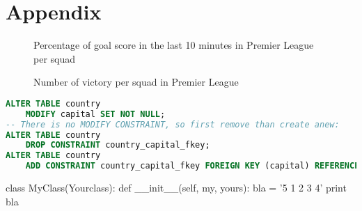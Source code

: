 \documentclass[a4paper,15pt]{article}
\begin{document}
\section{Appendix}

\begin{figure}[!htbp]
    \centering
        \caption{Percentage of goal score in the last 10 minutes in Premier League per squad}
\end{figure}

\mydata
    
\begin{figure}[!htbp]
    \centering
        \caption{Number of victory per squad in Premier League}
\end{figure}

\newpage

\begin{lstlisting}[language=SQL, style=sqlStyle]
ALTER TABLE country
	MODIFY capital SET NOT NULL;
-- There is no MODIFY CONSTRAINT, so first remove than create anew:
ALTER TABLE country
	DROP CONSTRAINT country_capital_fkey;
ALTER TABLE country
	ADD CONSTRAINT country_capital_fkey FOREIGN KEY (capital) REFERENCES city(id) ON DELETE CASCADE;
\end{lstlisting}

\begin{python}
class MyClass(Yourclass):
    def __init__(self, my, yours):
        bla = '5 1 2 3 4'
        print bla
\end{python}
\end{document}
